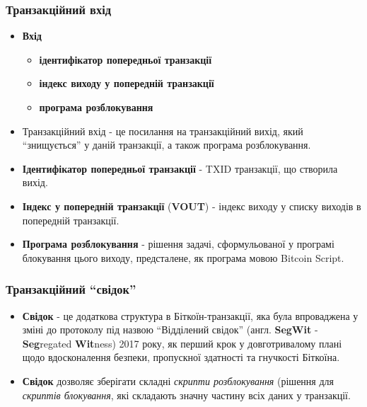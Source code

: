 \documentclass{beamer}
\begin{document}
\begin{frame}
  \frametitle{Транзакційний вхід}
  \begin{itemize}
  \item \textbf{Вхід}
    \begin{itemize}
    \item \textbf{ідентифікатор попередньої транзакції}
    \item \textbf{індекс виходу у попередній транзакції}
    \item \textbf{програма розблокування}
    \end{itemize}
  \item Транзакційний вхід - це посилання на транзакційний вихід, який
    ``знищується'' у даній транзакції, а також програма розблокування.
  \item \textbf{Ідентифікатор попередньої транзакції} - TXID транзакції, що
    створила вихід.
  \item \textbf{Індекс у попередній транзакції} (\textbf{VOUT}) - індекс виходу
    у списку виходів в попередній транзакції.
  \item \textbf{Програма розблокування} - рішення задачі, сформульованої у
    програмі блокування цього виходу, предсталене, як програма мовою Bitcoin
    Script.
  \end{itemize}
\end{frame}

\begin{frame}
  \frametitle{Транзакційний ``свідок''}
  \begin{itemize}
  \item \textbf{Свідок} - це додаткова структура в Біткоїн-транзакції, яка була
    впроваджена у зміні до протоколу під назвою ``Відділений свідок'' (англ. \textbf{SegWit} -
    \textbf{Seg}regated \textbf{Wit}ness) 2017 року, як перший крок у
    довготривалому плані щодо вдосконалення безпеки, пропускної здатності та
    гнучкості Біткоїна.
  \item \textbf{Свідок} дозволяє зберігати складні \textit{скрипти розблокування}
    (рішення для \textit{скриптів блокування}, які складають значну частину всіх
    даних у транзакції.
  \end{itemize}
\end{frame}
\end{document}

